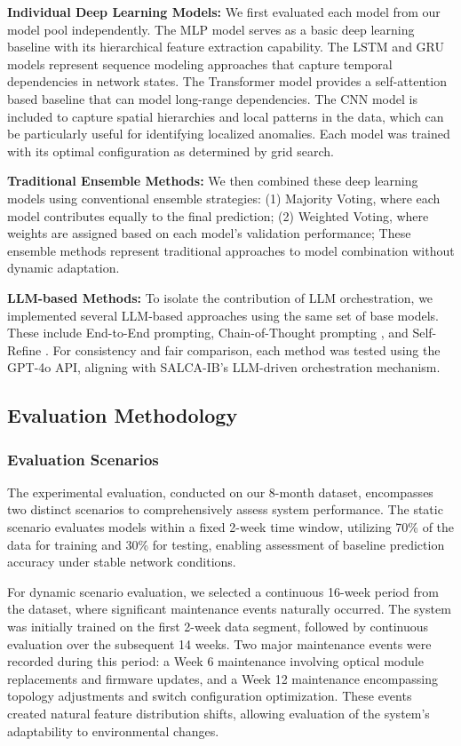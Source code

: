 \documentclass[conference]{IEEEtran}
\begin{document}
\textbf{Individual Deep Learning Models:} We first evaluated each model from our model pool independently. The MLP model serves as a basic deep learning baseline with its hierarchical feature extraction capability. The LSTM and GRU models represent sequence modeling approaches that capture temporal dependencies in network states. The Transformer model provides a self-attention based baseline that can model long-range dependencies. The CNN model is included to capture spatial hierarchies and local patterns in the data, which can be particularly useful for identifying localized anomalies. Each model was trained with its optimal configuration as determined by grid search.

\textbf{Traditional Ensemble Methods:} We then combined these deep learning models using conventional ensemble strategies:
(1) Majority Voting, where each model contributes equally to the final prediction;
(2) Weighted Voting, where weights are assigned based on each model's validation performance;
These ensemble methods represent traditional approaches to model combination without dynamic adaptation.

\textbf{LLM-based Methods:} To isolate the contribution of LLM orchestration, we implemented several LLM-based approaches using the same set of base models. These include End-to-End prompting, Chain-of-Thought prompting \cite{chen2023}, and Self-Refine \cite{madaan2023}. For consistency and fair comparison, each method was tested using the GPT-4o API, aligning with SALCA-IB's LLM-driven orchestration mechanism.

\subsection{Evaluation Methodology}

\subsubsection{Evaluation Scenarios}
The experimental evaluation, conducted on our 8-month dataset, encompasses two distinct scenarios to comprehensively assess system performance. The static scenario evaluates models within a fixed 2-week time window, utilizing 70\% of the data for training and 30\% for testing, enabling assessment of baseline prediction accuracy under stable network conditions.

For dynamic scenario evaluation, we selected a continuous 16-week period from the dataset, where significant maintenance events naturally occurred. The system was initially trained on the first 2-week data segment, followed by continuous evaluation over the subsequent 14 weeks. Two major maintenance events were recorded during this period: a Week 6 maintenance involving optical module replacements and firmware updates, and a Week 12 maintenance encompassing topology adjustments and switch configuration optimization. These events created natural feature distribution shifts, allowing evaluation of the system's adaptability to environmental changes.
\end{document}
